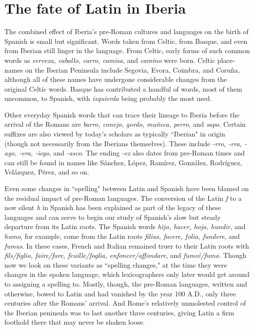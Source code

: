 \section{The fate of Latin in Iberia}

The combined effect of Iberia's pre-Roman cultures and languages on the birth of Spanish is small but significant. Words taken
from Celtic, from Basque, and even from Iberian still linger in the language. From Celtic, early forms of such common words as \emph{cerveza, caballo, carro, camisa}, and \emph{camino} were born. Celtic place-names on
the Iberian Peninsula include Segovia, Evora, Coimbra, and Coruña, although all of these names have undergone considerable changes from
the original Celtic words. Basque has contributed a handful of words,
most of them uncommon, to Spanish, with \emph{izquierda} being probably
the most used.

Other everyday Spanish words that can trace their lineage to
Iberia before the arrival of the Romans are \emph{barro, conejo, gordo, muñeca, perro}, and \emph{sapo}. Certain suffixes are also viewed by today's scholars as typically ``Iberian" in origin (though not necessarily from the
Iberians themselves). These include \emph{-rro, -rra, -ago, -era, -iego}, and
\emph{-asco}. The ending \emph{-ez} also dates from pre-Roman times and can still
be found in names like Sánchez, López, Ramírez, González, Rodríguez,
Velázquez, Pérez, and so on.

Even some changes in ``spelling" between Latin and Spanish
have been blamed on the residual impact of pre-Roman languages. The
conversion of the Latin \emph{f} to a now silent \emph{h} in Spanish has been explained as part of the legacy of these languages and can serve to begin
our study of Spanish's slow but steady departure from its Latin roots.
The Spanish words \emph{hijo, hacer, hoja, hundir}, and \emph{humo}, for example,
come from the Latin roots \emph{filius, facere, folia, fundere}, and \emph{fumus}. In
these cases, French and Italian remained truer to their Latin roots with
\emph{fils/figlio, faire/fare, feuille/foglia, enfoncer/affondare}, and \emph{fumeé/fumo}. Though now we look on these variants as ``spelling changes," at
the time they were changes in the spoken language, which lexicographers
only later would get around to assigning a spelling to. Mostly, though,
the pre-Roman languages, written and otherwise, bowed to Latin and
had vanished by the year 100 A.D., only three centuries after the Romans' arrival. And Rome's relatively unmolested control of the Iberian
peninsula was to last another three centuries, giving Latin a firm foothold there that may never be shaken loose.

